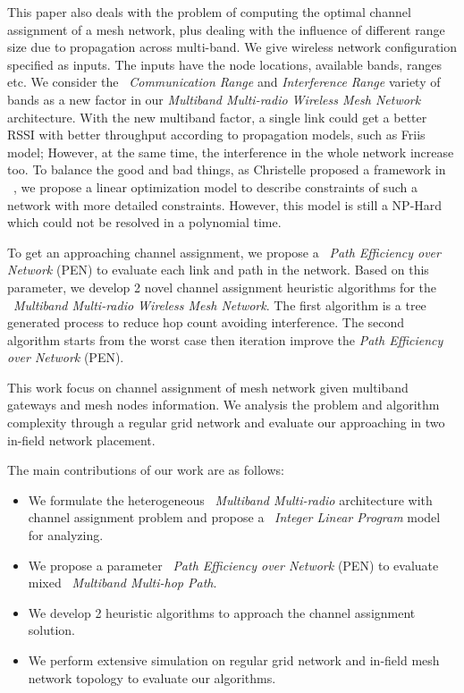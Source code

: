 This paper also deals with the problem of computing the optimal channel assignment of a mesh network, plus dealing with the influence of different range size due to propagation across multi-band. 
We give wireless network configuration specified as inputs. 
The inputs have the node locations, available bands, ranges etc. We consider the ~\emph{Communication Range} and \emph{Interference Range} variety of bands as a new factor in our \emph{Multiband Multi-radio Wireless Mesh Network} architecture.  
With the new multiband factor, a single link could get a better RSSI with better throughput according to propagation models, such as Friis model; However, at the same time, the interference in the whole network increase too. 
To balance the good and bad things, as Christelle proposed a framework in ~\cite{yuan2006cross}, we propose a linear optimization model to describe constraints of such a network with more detailed constraints. However, this model is still a NP-Hard which could not be resolved in a polynomial time. 

To get an approaching channel assignment, we propose a ~\emph{Path Efficiency over Network} (PEN) to evaluate each link and path in the network. Based on this parameter, we develop 2 novel channel assignment heuristic algorithms for the ~\emph{Multiband Multi-radio Wireless Mesh Network}. The first algorithm is a tree generated process to reduce hop count avoiding interference. The second algorithm starts from the worst case then iteration improve the \emph{Path Efficiency over Network} (PEN).

This work focus on channel assignment of mesh network given multiband gateways and mesh nodes information.
We analysis the problem and algorithm complexity through a regular grid network and evaluate our approaching in two in-field network placement. 

% 
The main contributions of our work are as follows:
\begin{itemize}
\item We formulate the heterogeneous ~\emph{Multiband Multi-radio} architecture with channel assignment problem and propose a ~\emph{Integer Linear Program} model for analyzing.  

\item We propose a  parameter ~\emph{Path Efficiency over Network} (PEN) to evaluate mixed ~\emph{Multiband Multi-hop Path}.

\item We develop 2 heuristic algorithms to approach the channel assignment solution.

\item We perform extensive simulation on regular grid network and in-field mesh network topology to evaluate our algorithms.


\end{itemize}

